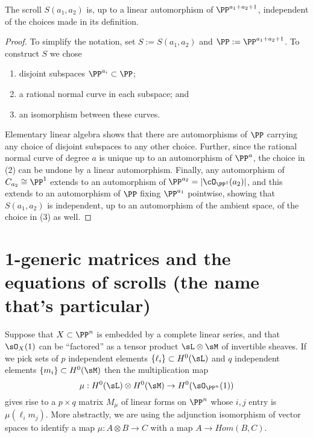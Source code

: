 \begin{proposition}\label{uniqueness of scrolls}
The scroll $S(a_1,a_2)$ is, up to a linear automorphism of $\PP^{a_1+a_2+1}$, independent of the choices made in its
 definition. 
\end{proposition}

\begin{proof} 
To simplify the notation, set $S := S(a_{1}, a_{2})$ and $\PP := \PP^{a_1+a_2+1}$.
To construct $S$ we chose 
\begin{enumerate}
 \item disjoint subspaces $\PP^{a_i}\subset \PP$;
 \item a rational normal curve in each subspace; and
 \item an isomorphism between these curves.
\end{enumerate}
Elementary linear algebra shows that there are automorphisms of $\PP$ carrying any choice of disjoint subspaces to any other choice. Further, since the rational normal curve of degree $a$ is unique up to an automorphism of $\PP^{a}$, the choice in (2) can be undone by a linear automorphism. Finally, any automorphism of $C_{a_{2}}\cong \PP^{1}$ extends to an automorphism of $\PP^{a_{2}} = |\cO_{\PP^{1}}(a_{2})|$, and this extends to an automorphism of $\PP$ fixing $\PP^{a_{1}}$ pointwise,
showing that $S(a_{1}, a_{2})$ is independent, up to an automorphism of the ambient space, of the choice in (3)  as well.
\end{proof}



\section{1-generic matrices and the equations of scrolls
(the name that's particular)}\label{particular name}

Suppose that $X \subset \PP^n$ is embedded by a complete linear series, and that
$\sO_X(1)$ can be ``factored'' as a tensor product $\sL\otimes \sM$ of invertible sheaves. If we pick sets of $p$ independent elements $\{\ell_i\}\subset H^0(\sL)$ and  $q$ independent elements $\{m_i\} \subset H^0(\sM)$ then the multiplication map 
$$
\mu: H^0(\sL) \otimes H^0(\sM) \to H^0(\sO_{\PP^n}(1))
$$
 gives rise to 
a $p\times q$ matrix $M_\mu$ of linear forms on $\PP^n$ whose $i,j$ entry is $\mu(\ell_im_j)$.
More abstractly, we are using the adjunction isomorphism of vector spaces
to identify a map $\mu: A\otimes B \to C$ with a map $A \to Hom(B,C)$.

